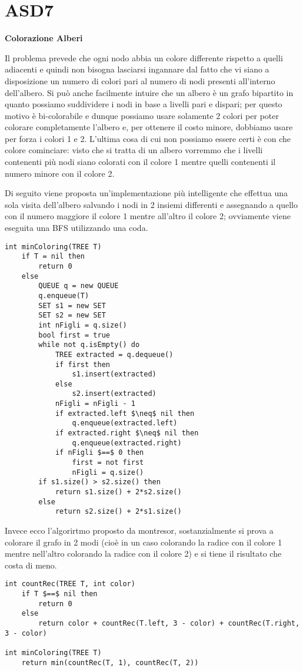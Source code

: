\documentclass[../cheatSheetAlgoritmi.tex]{subfiles}
\begin{document}
\section{ASD7}
\textbf{Colorazione Alberi}

Il problema prevede che ogni nodo abbia un colore differente rispetto a quelli adiacenti e quindi non bisogna lasciarsi ingannare dal fatto che vi siano a disposizione un numero di colori pari al numero di nodi presenti all'interno dell'albero. Si può anche facilmente intuire che un albero è un grafo bipartito in quanto possiamo suddividere i nodi in base a livelli pari e dispari; per questo motivo è bi-colorabile e dunque possiamo usare solamente 2 colori per poter colorare completamente l'albero e, per ottenere il costo minore, dobbiamo usare per forza i colori 1 e 2. L'ultima cosa di cui non possiamo essere certi è con che colore cominciare: visto che si tratta di un albero vorremmo che i livelli contenenti più nodi siano colorati con il colore 1 mentre quelli contenenti il numero minore con il colore 2.

Di seguito viene proposta un'implementazione più intelligente che effettua una sola visita dell'albero salvando i nodi in 2 insiemi differenti e assegnando a quello con il numero maggiore il colore 1 mentre all'altro il colore 2; ovviamente viene eseguita una BFS utilizzando una coda.
\begin{lstlisting}[caption=Colorazione Alberi]
int minColoring(TREE T)
	if T = nil then
    	return 0
  	else
    	QUEUE q = new QUEUE
    	q.enqueue(T)
    	SET s1 = new SET
    	SET s2 = new SET
    	int nFigli = q.size()
    	bool first = true
    	while not q.isEmpty() do
      		TREE extracted = q.dequeue()
      		if first then
        		s1.insert(extracted)
      		else
        		s2.insert(extracted)
      		nFigli = nFigli - 1
      		if extracted.left $\neq$ nil then
        		q.enqueue(extracted.left)
      		if extracted.right $\neq$ nil then
       			q.enqueue(extracted.right)
      		if nFigli $==$ 0 then
        		first = not first
        		nFigli = q.size()
    	if s1.size() > s2.size() then
      		return s1.size() + 2*s2.size()
    	else
      		return s2.size() + 2*s1.size()
\end{lstlisting}
Invece ecco l'algorirtmo proposto da montresor, sostanzialmente si prova a colorare il grafo in 2 modi (cioè in un caso colorando la radice con il colore 1 mentre nell'altro colorando la radice con il colore 2) e si tiene il risultato che costa di meno.
\begin{lstlisting}[caption=Colorazione Alberi (by Montresor)]
int countRec(TREE T, int color)
	if T $==$ nil then
    	return 0
  	else
    	return color + countRec(T.left, 3 - color) + countRec(T.right, 3 - color)

int minColoring(TREE T)
	return min(countRec(T, 1), countRec(T, 2))
\end{lstlisting}

\newpage
\end{document}
